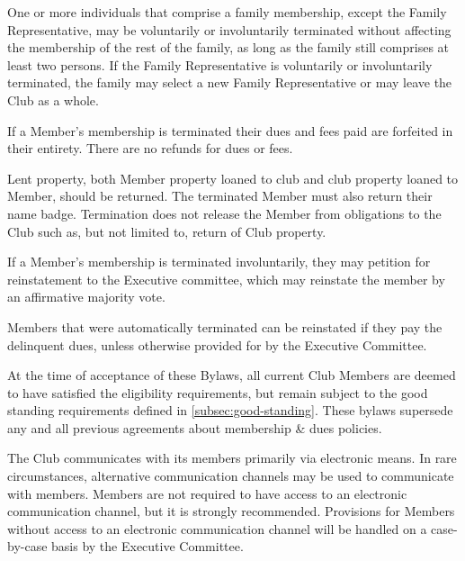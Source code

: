 \documentclass{bylaws}
\begin{document}
One or more individuals that comprise a family membership, except the Family Representative, may be voluntarily or involuntarily terminated without affecting the membership of the rest of the family, as long as the family still comprises at least two persons. If the Family Representative is voluntarily or involuntarily terminated, the family may select a new Family Representative or may leave the Club as a whole. 

If a Member's membership is terminated their dues and fees paid are forfeited in their entirety. There are no refunds for dues or fees. 

Lent property, both Member property loaned to club and club property loaned to Member, should be returned. The terminated Member must also return their name badge. Termination does not release the Member from obligations to the Club such as, but not limited to, return of Club property. 

If a Member's membership is terminated involuntarily, they may petition for reinstatement to the Executive committee, which may reinstate the member by an affirmative majority vote. 

Members that were automatically terminated can be reinstated if they pay the delinquent dues, unless otherwise provided for by the Executive Committee. 


At the time of acceptance of these Bylaws, all current Club Members are deemed to have satisfied the eligibility requirements, but remain subject to the good standing requirements defined in \ref{subsec:good-standing}. These bylaws supersede any and all previous agreements about membership \& dues policies. 


\label{art:communication}

The Club communicates with its members primarily via electronic means.  In rare circumstances, alternative communication channels may be used to communicate with members.  Members are not required to have access to an electronic communication channel, but it is strongly recommended.  Provisions for Members without access to an electronic communication channel will be handled on a case-by-case basis by the Executive Committee. 
\end{document}
